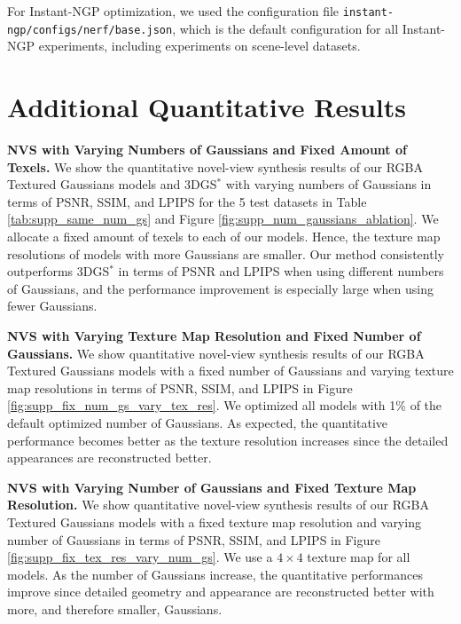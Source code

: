 For Instant-NGP optimization, we used the configuration file \texttt{instant-ngp/configs/nerf/base.json}, which is the default configuration for all Instant-NGP experiments, including experiments on scene-level datasets.

\section{Additional Quantitative Results}

\noindent \textbf{NVS with Varying Numbers of Gaussians and Fixed Amount of Texels. } We show the quantitative novel-view synthesis results of our RGBA Textured Gaussians models and 3DGS$^*$ with varying numbers of Gaussians in terms of PSNR, SSIM, and LPIPS for the 5 test datasets in Table \ref{tab:supp_same_num_gs} and Figure \ref{fig:supp_num_gaussians_ablation}. We allocate a fixed amount of texels to each of our models. Hence, the texture map resolutions of models with more Gaussians are smaller. Our method consistently outperforms 3DGS$^*$ in terms of PSNR and LPIPS when using different numbers of Gaussians, and the performance improvement is especially large when using fewer Gaussians. 

\noindent \textbf{NVS with Varying Texture Map Resolution and Fixed Number of Gaussians. } We show quantitative novel-view synthesis results of our RGBA Textured Gaussians models with a fixed number of Gaussians and varying texture map resolutions in terms of PSNR, SSIM, and LPIPS in Figure \ref{fig:supp_fix_num_gs_vary_tex_res}. We optimized all models with 1\% of the default optimized number of Gaussians. As expected, the quantitative performance becomes better as the texture resolution increases since the detailed appearances are reconstructed better. 

\noindent \textbf{NVS with Varying Number of Gaussians and Fixed Texture Map Resolution. } We show quantitative novel-view synthesis results of our RGBA Textured Gaussians models with a fixed texture map resolution and varying number of Gaussians in terms of PSNR, SSIM, and LPIPS in Figure \ref{fig:supp_fix_tex_res_vary_num_gs}. We use a $4 \times 4$ texture map for all models. As the number of Gaussians increase, the quantitative performances improve since detailed geometry and appearance are reconstructed better with more, and therefore smaller, Gaussians. 



